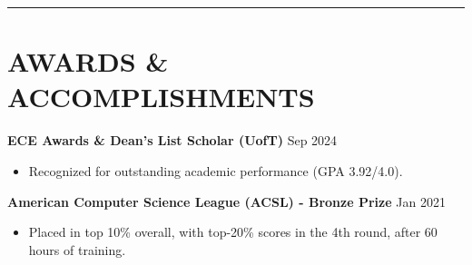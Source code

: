 \documentclass[a4paper,10pt]{article}
\begin{document}
\noindent\rule{\linewidth}{1pt}

\section*{\textbf{AWARDS \& ACCOMPLISHMENTS}}

\noindent\textbf{ECE Awards \& Dean's List Scholar (UofT)} \hfill Sep 2024
\begin{itemize}[leftmargin=0.2in]
    \item Recognized for outstanding academic performance (GPA 3.92/4.0).
\end{itemize}

\vspace{0.3cm}
\noindent\textbf{American Computer Science League (ACSL) - Bronze Prize} \hfill Jan 2021
\begin{itemize}[leftmargin=0.2in]
    \item Placed in top 10\% overall, with top-20\% scores in the 4th round, after 60 hours of training.
\end{itemize}
\end{document}
